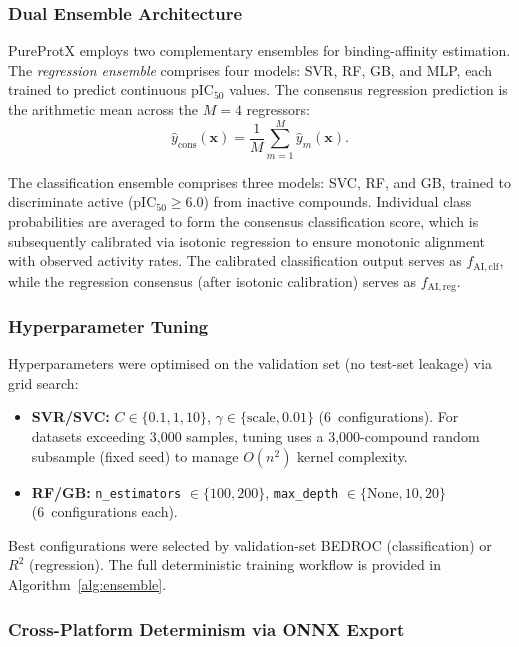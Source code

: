 \documentclass[conference]{IEEEtran}
\begin{document}
\subsubsection{Dual Ensemble Architecture}
PureProtX employs two complementary ensembles for
binding-affinity estimation.
The \emph{regression ensemble} comprises four models:
SVR, RF, GB, and MLP, each trained to predict continuous
pIC$_{50}$ values.
The consensus regression prediction is the arithmetic
mean across the $M{=}4$ regressors:
\begin{equation}
\label{eq:consensus-reg}
\hat{y}_{\mathrm{cons}}(\mathbf{x})
  = \frac{1}{M}\sum_{m=1}^{M}\hat{y}_m(\mathbf{x}).
\end{equation}

The classification ensemble comprises three models:
SVC, RF, and GB, trained to discriminate active
(pIC$_{50} \geq 6.0$) from inactive compounds.
Individual class probabilities are averaged to form the
consensus classification score, which is subsequently
calibrated via isotonic regression to ensure monotonic
alignment with observed activity rates.
The calibrated classification output serves as
$f_{\mathrm{AI,clf}}$, while the regression consensus
(after isotonic calibration) serves as
$f_{\mathrm{AI,reg}}$.

\subsubsection{Hyperparameter Tuning}
Hyperparameters were optimised on the validation set
(no test-set leakage) via grid search:
\begin{itemize}
    \item \textbf{SVR/SVC:} $C \in \{0.1, 1, 10\}$,
    $\gamma \in \{\mathrm{scale}, 0.01\}$ (6~configurations).
    For datasets exceeding 3{,}000 samples, tuning uses
    a 3{,}000-compound random subsample (fixed seed) to
    manage $O(n^2)$ kernel complexity.
    \item \textbf{RF/GB:} \texttt{n\_estimators}
    $\in \{100, 200\}$, \texttt{max\_depth}
    $\in \{\mathrm{None}, 10, 20\}$ (6~configurations each).
\end{itemize}
Best configurations were selected by validation-set BEDROC
(classification) or $R^2$ (regression).
The full deterministic training workflow is provided
in Algorithm~\ref{alg:ensemble}.

\subsubsection{Cross-Platform Determinism via ONNX Export}
\label{sec:onnx}
\end{document}
